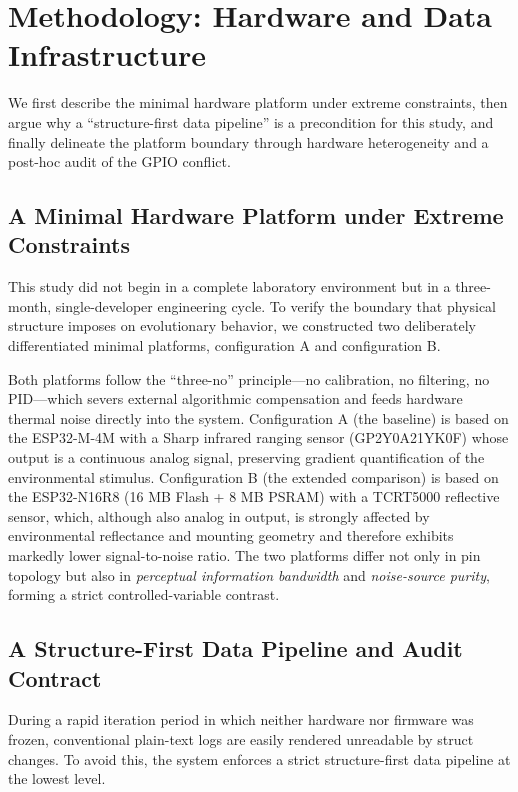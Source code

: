 \documentclass[11pt]{article}
\begin{document}
\section{Methodology: Hardware and Data Infrastructure}
\label{sec:method}

We first describe the minimal hardware platform under extreme constraints, then argue why a ``structure-first data pipeline'' is a precondition for this study, and finally delineate the platform boundary through hardware heterogeneity and a post-hoc audit of the GPIO conflict.

\subsection{A Minimal Hardware Platform under Extreme Constraints}
This study did not begin in a complete laboratory environment but in a three-month, single-developer engineering cycle. To verify the boundary that physical structure imposes on evolutionary behavior, we constructed two deliberately differentiated minimal platforms, configuration A and configuration B.

Both platforms follow the ``three-no'' principle---no calibration, no filtering, no PID---which severs external algorithmic compensation and feeds hardware thermal noise directly into the system. Configuration A (the baseline) is based on the ESP32-M-4M with a Sharp infrared ranging sensor (GP2Y0A21YK0F) whose output is a continuous analog signal, preserving gradient quantification of the environmental stimulus. Configuration B (the extended comparison) is based on the ESP32-N16R8 (16 MB Flash + 8 MB PSRAM) with a TCRT5000 reflective sensor, which, although also analog in output, is strongly affected by environmental reflectance and mounting geometry and therefore exhibits markedly lower signal-to-noise ratio. The two platforms differ not only in pin topology but also in \emph{perceptual information bandwidth} and \emph{noise-source purity}, forming a strict controlled-variable contrast.

\subsection{A Structure-First Data Pipeline and Audit Contract}
During a rapid iteration period in which neither hardware nor firmware was frozen, conventional plain-text logs are easily rendered unreadable by struct changes. To avoid this, the system enforces a strict structure-first data pipeline at the lowest level.
\end{document}
